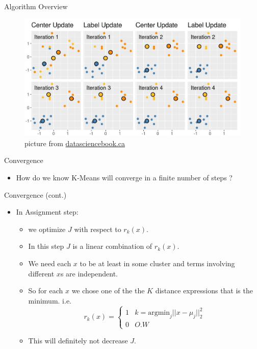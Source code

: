 \documentclass[serif, aspectratio=169]{beamer}
\begin{document}
\begin{frame}{Algorithm Overview}
    \begin{figure}
        \centering
        \includegraphics[scale=0.45]{pic/figs/actionmeans.jpg}
        \caption{picture from \href{https://datasciencebook.ca/clustering.html}{datasciencebook.ca}}
    \end{figure}
\end{frame}

\begin{frame}{Convergence}
    \begin{itemize}
    \item How do we know K-Means will converge in a finite number of steps ?
        
    \end{itemize}
\end{frame}

\begin{frame}{Convergence (cont.)}
\begin{itemize}
    \item  In Assignment step:
        \begin{itemize}
        \item  we optimize \( J \) with respect to \( r_k(x) \).
        \item In this step \( J \) is a linear combination of \( r_k(x) \).
        \item We need each $x$ to be at least in some cluster and terms involving different $x$s are independent.
        \item So for each $x$ we chose one of the the $K$ distance expressions that is the minimum. i.e. 
            $$
            r_k(x) = 
            \begin{cases}
                1 & k = \text{argmin}_j ||x-\mu_j ||_2^2 \\
                0 & O.W
            \end{cases}
            $$
            \item This will definitely not decrease $J$.
        \end{itemize}
            
\end{itemize}
    
\end{frame}
\end{document}
